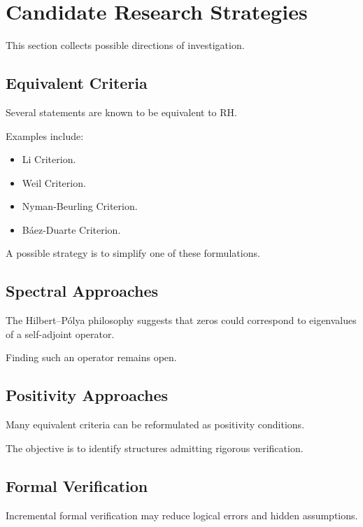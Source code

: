 \section{Candidate Research Strategies}

This section collects possible directions of investigation.

\subsection{Equivalent Criteria}

Several statements are known to be equivalent to RH.

Examples include:

\begin{itemize}
\item Li Criterion.
\item Weil Criterion.
\item Nyman-Beurling Criterion.
\item Báez-Duarte Criterion.
\end{itemize}

A possible strategy is to simplify one of these formulations.

\subsection{Spectral Approaches}

The Hilbert--Pólya philosophy suggests that zeros could correspond to eigenvalues of a self-adjoint operator.

Finding such an operator remains open.

\subsection{Positivity Approaches}

Many equivalent criteria can be reformulated as positivity conditions.

The objective is to identify structures admitting rigorous verification.

\subsection{Formal Verification}

Incremental formal verification may reduce logical errors and hidden assumptions.